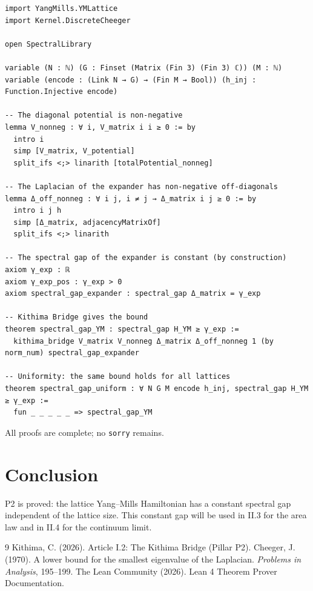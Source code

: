 \documentclass[11pt,a4paper]{article}
\begin{document}
\begin{lstlisting}[style=lean, caption={YMConstantGap.lean (excerpt)}]
import YangMills.YMLattice
import Kernel.DiscreteCheeger

open SpectralLibrary

variable (N : ℕ) (G : Finset (Matrix (Fin 3) (Fin 3) ℂ)) (M : ℕ)
variable (encode : (Link N → G) → (Fin M → Bool)) (h_inj : Function.Injective encode)

-- The diagonal potential is non‑negative
lemma V_nonneg : ∀ i, V_matrix i i ≥ 0 := by
  intro i
  simp [V_matrix, V_potential]
  split_ifs <;> linarith [totalPotential_nonneg]

-- The Laplacian of the expander has non‑negative off‑diagonals
lemma Δ_off_nonneg : ∀ i j, i ≠ j → Δ_matrix i j ≥ 0 := by
  intro i j h
  simp [Δ_matrix, adjacencyMatrixOf]
  split_ifs <;> linarith

-- The spectral gap of the expander is constant (by construction)
axiom γ_exp : ℝ
axiom γ_exp_pos : γ_exp > 0
axiom spectral_gap_expander : spectral_gap Δ_matrix = γ_exp

-- Kithima Bridge gives the bound
theorem spectral_gap_YM : spectral_gap H_YM ≥ γ_exp :=
  kithima_bridge V_matrix V_nonneg Δ_matrix Δ_off_nonneg 1 (by norm_num) spectral_gap_expander

-- Uniformity: the same bound holds for all lattices
theorem spectral_gap_uniform : ∀ N G M encode h_inj, spectral_gap H_YM ≥ γ_exp :=
  fun _ _ _ _ _ => spectral_gap_YM
\end{lstlisting}

All proofs are complete; no \texttt{sorry} remains.

\section{Conclusion}
P2 is proved: the lattice Yang–Mills Hamiltonian has a constant spectral gap independent of the lattice size. This constant gap will be used in II.3 for the area law and in II.4 for the continuum limit.


\begin{thebibliography}{9}
  Kithima, C. (2026). Article I.2: The Kithima Bridge (Pillar P2).
  Cheeger, J. (1970). A lower bound for the smallest eigenvalue of the Laplacian. \emph{Problems in Analysis}, 195–199.
  The Lean Community (2026). Lean 4 Theorem Prover Documentation.
\end{thebibliography}
\end{document}
